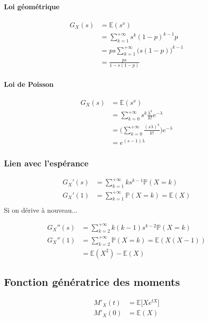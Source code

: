 \documentclass{article}
\begin{document}
\paragraph{Loi géométrique}
\begin{align*}
  G_X(s) &= \mathbb{E}(s^x) \\
  &= \sum_{k=1}^{+ \infty} s^k (1-p)^{k-1}p \\
  &= ps \sum_{k=1}^{+ \infty} \big( s(1-p)\big)^{k-1} \\
  &= \frac{ps}{1-s(1-p)}
\end{align*}

\paragraph{Loi de Poisson}
\begin{align*}
  G_X(s) &= \mathbb{E}(s^x) \\
  &= \sum_{k=0}^{+ \infty} s^k \frac{\lambda^k}{k!} e^{-\lambda} \\
  &= \bigg( \sum_{k=0}^{+ \infty} \frac{(s\lambda)^k}{k!}\bigg)e^{-\lambda} \\
  &= e^{(s-1)\lambda}
\end{align*}

\subsubsection{Lien avec l'espérance}

\begin{align*}
  G_X'(s) &= \sum_{k=1}^{+ \infty} k s^{k-1} \mathbb{P}(X=k) \\
  G_X'(1) &= \sum_{k=1}^{+ \infty} \mathbb{P}(X=k)  = \mathbb{E}(X)\\
\end{align*}
Si on dérive à nouveau...

\begin{align*}
  G_X''(s) &= \sum_{k=2}^{+ \infty} k (k-1)s^{k-2} \mathbb{P}(X=k) \\
  G_X''(1) &= \sum_{k=2}^{+ \infty} \mathbb{P}(X=k)  = \mathbb{E}(X(X-1))\\
  &= \mathbb{E}(X^2) - \mathbb{E}(X)
\end{align*}

\subsection{Fonction génératrice des moments}
\begin{align*}
  M'_X(t) &= \mathbb{E}\Big[ X e^{tX}\Big] \\
  M'_X(0) &= \mathbb{E}(X) \\
\end{align*}
\end{document}

